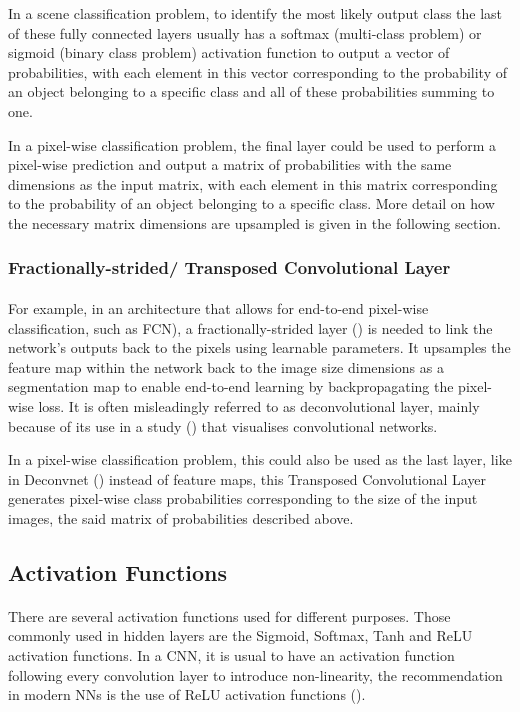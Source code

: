 In a scene classification problem, to identify the most likely output class the last of these fully connected layers usually has a softmax (multi-class problem) or sigmoid (binary class problem) activation function to output a vector of probabilities, with each element in this vector corresponding to the probability of an object belonging to a specific class and all of these probabilities summing to one.

In a pixel-wise classification problem, the final layer could be used to perform a pixel-wise prediction and output a matrix of probabilities with the same dimensions as the input matrix, with each element in this matrix corresponding to the probability of an object belonging to a specific class. More detail on how the necessary matrix dimensions are upsampled is given in the following section.

\subsubsection{Fractionally-strided/ Transposed Convolutional Layer}
\paragraph{}
For example, in an architecture that allows for end-to-end pixel-wise classification, such as \gls{FCN}), a fractionally-strided layer (\cite{long2015fully}) is needed to link the network's outputs back to the pixels using learnable parameters. It upsamples the feature map within the network back to the image size dimensions as a segmentation map to enable end-to-end learning by backpropagating the pixel-wise loss. It is often misleadingly referred to as deconvolutional layer, mainly because of its use in a study (\cite{zeiler2013visualizing}) that visualises convolutional networks. 

In a pixel-wise classification problem, this could also be used as the last layer, like in Deconvnet (\cite{7410535}) instead of feature maps, this Transposed Convolutional Layer generates pixel-wise class probabilities corresponding to the size of the input images, the said matrix of probabilities described above.

\subsection{Activation Functions} \label{cnn_activation}
\paragraph{}
There are several activation functions used for different purposes. Those commonly used in hidden layers are the Sigmoid, Softmax, Tanh and \gls{ReLU} activation functions.
In a \gls{CNN}, it is usual to have an activation function following every convolution layer to introduce non-linearity, the recommendation in modern \gls{NN}s is the use of \gls{ReLU} activation functions (\cite{GoodBengCour16}).

